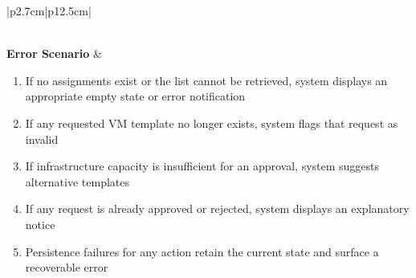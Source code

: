 \begin{table}[H]
\begin{tabular}{|p{2.7cm}|p{12.5cm}|}
\begin{minipage}[t]{\linewidth}
\begin{enumerate}[topsep=0pt,itemsep=1pt,parsep=0pt,partopsep=0pt]
            \end{enumerate}
        \end{minipage} \\
        \hline
        \textbf{Error Scenario} & \begin{minipage}[t]{\linewidth}
            \begin{enumerate}[topsep=0pt,itemsep=1pt,parsep=0pt,partopsep=0pt]
                \item If no assignments exist or the list cannot be retrieved, system displays an appropriate empty state or error notification
                \item If any requested VM template no longer exists, system flags that request as invalid
                \item If infrastructure capacity is insufficient for an approval, system suggests alternative templates
                \item If any request is already approved or rejected, system displays an explanatory notice
                \item Persistence failures for any action retain the current state and surface a recoverable error
            \end{enumerate}
        \end{minipage} \\
        \hline
    \end{tabular}
    \label{tab:admin-manage-vm-assignments}
\end{table}


